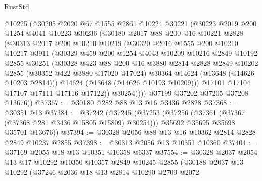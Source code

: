 \begin{lexlean}{RustStd}
\begin{coremodule}
          @10225
          (@30205
            @2020
            @67
            @1555
            @2861
            @10224
            @30221
            (@30223
              @2019
              @200
              @1254
              @4041
              @10223
              @30236
              (@30180
                @2017
                @88
                @200
                @16
                @10221
                @2828
                (@30313
                  @2017
                  @200
                  @10210
                  @10219
                  (@30320
                    @2016
                    @1555
                    @200
                    @10210
                    @10217
                    @3911
                    (@30329
                      @459
                      @200
                      @1254
                      @4043
                      @10209
                      @10216
                      @2849
                      @10192
                      @2855
                      @30251
                      (@30328
                        @423
                        @88
                        @200
                        @16
                        @3880
                        @2814
                        @2828
                        @2849
                        @10202
                        @2855
                        (@30352 @422 @3880 @17020 @17024)
                        @30364
                        @14624
                        (@13648 (@14626 @10203 @2814)))
                      @14624
                      (@13648 (@14626 @10193 @10209)))
                    @17101
                    @17104
                    @17107
                    @17111
                    @17116
                    @17122))
                @30254))))
        @37199
        @37202
        @37205
        @37208
        @13676))
@37367 := @30180 @282 @88 @13 @16 @3436 @2828
@37368 := @30351 @13
@37384 := @37242
    (@37245
      (@37253
        (@37256 (@37361 (@37367 (@37368 @281 @3436 @15805 @15809) @30254)))
        @35692
        @35695
        @35698
        @35701
        @13676))
@37394 := @30328 @2056 @88 @13 @16 @10362 @2814 @2828 @2849 @10237 @2855
@37398 := @30313 @2056 @13 @10351 @10360
@37404 := @37169 @2055 @18 @13 @10351 @10358 @6337
@37554 := @30328
    @2037
    @2054
    @13
    @17
    @10292
    @10350
    @10357
    @2849
    @10245
    @2855
    (@30188
      @2037
      @13
      @10292
      (@37246
        @2036
        @18
        @13
        @2814
        @10290
        @2709
        @2072

\end{coremodule}
\end{lexlean}
